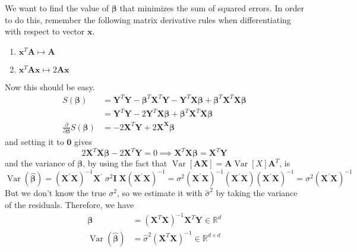 \documentclass{article}
\DeclareMathOperator{\Var}{Var}
\begin{document}
    We want to find the value of $\boldsymbol{\beta}$ that minimizes the sum of squared errors. In order to do this, remember the following matrix derivative rules when differentiating with respect to vector $\mathbf{x}$. 
    \begin{enumerate}
      \item $\mathbf{x}^T \mathbf{A} \mapsto \mathbf{A}$
      \item $\mathbf{x}^T \mathbf{A} \mathbf{x} \mapsto 2 \mathbf{A} \mathbf{x}$
    \end{enumerate}
    Now this should be easy. 
    \begin{align*}
        S(\boldsymbol{\beta}) & = \mathbf{Y}^T \mathbf{Y} - \boldsymbol{\beta}^T \mathbf{X}^T \mathbf{Y} - \mathbf{Y}^T \mathbf{X} \boldsymbol{\beta} + \boldsymbol{\beta}^T \mathbf{X}^T \mathbf{X} \boldsymbol{\beta} \\
        & = \mathbf{Y}^T \mathbf{Y} - 2 \mathbf{Y}^T \mathbf{X} \boldsymbol{\beta} + \boldsymbol{\beta}^T \mathbf{X}^T \mathbf{X} \boldsymbol{\beta} \\
        \frac{\partial}{\partial \boldsymbol{\beta}} S(\boldsymbol{\beta}) & = - 2 \mathbf{X}^T \mathbf{Y} + 2 \mathbf{X}^ \mathbf{X} \boldsymbol{\beta}
    \end{align*}
    and setting it to $\mathbf{0}$ gives 
    \[2 \mathbf{X}^T \mathbf{X} \boldsymbol{\beta} - 2 \mathbf{X}^T \mathbf{Y} = 0 \implies \mathbf{X}^T \mathbf{X} \boldsymbol{\beta} = \mathbf{X}^T \mathbf{Y}\]
    and the variance of $\boldsymbol{\beta}$, by using the fact that $\Var[\mathbf{A} \mathbf{X}] = \mathbf{A} \Var[X] \mathbf{A}^T$, is
    \[\Var(\hat{\boldsymbol{\beta}}) =
     (\mathbf{X}^{\prime} \mathbf{X})^{-1} \mathbf{X}^{\prime}
     \;\sigma^2 \mathbf{I} \; \mathbf{X}  (\mathbf{X}^{\prime} \mathbf{X})^{-1}
    = \sigma^2 (\mathbf{X}^{\prime} \mathbf{X})^{-1} (\mathbf{X}^{\prime}
     \mathbf{X})  (\mathbf{X}^{\prime} \mathbf{X})^{-1}
    = \sigma^2  (\mathbf{X}^{\prime} \mathbf{X})^{-1}\]
    But we don't know the true $\sigma^2$, so we estimate it with $\hat{\sigma}^2$ by taking the variance of the residuals. Therefore, we have 
    \begin{align*}
        \boldsymbol{\beta} & = (\mathbf{X}^T \mathbf{X})^{-1} \mathbf{X}^T \mathbf{Y} \in \mathbb{R}^d \\
        \Var(\hat{\boldsymbol{\beta}}) & = \hat{\sigma}^2 (\mathbf{X}^T \mathbf{X})^{-1} \in \mathbb{R}^{d \times d}
    \end{align*}
\end{document}
